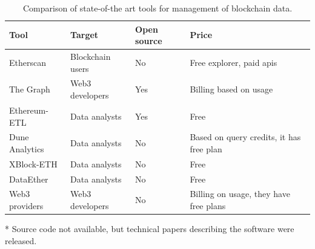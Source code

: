 \begin{table}[ht!]
\centering
    \begin{threeparttable}
    \begin{tabular}  { m{3cm} m{3cm} m{1.5cm} m{5cm} } 
    \toprule
    \textbf{Tool} & \textbf{Target} & \textbf{Open source} & \textbf{Price}  \\
    \midrule
    Etherscan    & Blockchain users  & No & Free explorer, paid apis  \\[2.3ex]
    The Graph     & Web3 developers & Yes & Billing based on usage  \\[1.3ex]
    Ethereum-ETL     & Data analysts & Yes & Free  \\[1.3ex]
    Dune Analytics      & Data analysts & No & Based on query credits, it has free plan \\[2.6ex]
    XBlock-ETH  & Data analysts & No\tnote{*} & Free   \\[1.3ex]
    DataEther  & Data analysts & No\tnote{*} & Free   \\[1.3ex]
    Web3 providers      & Web3 developers & No & Billing on usage, they have free plans   \\[1.6ex]
    \bottomrule
    \end{tabular}
    \begin{tablenotes}
      \item[*] Source code not available, but technical papers describing the software were released.
      \end{tablenotes}
    \end{threeparttable}
\caption[State of the art tools comparison]{Comparison of state-of-the art tools for management of blockchain data.}
\label{table:tools-comparison}
\end{table}
